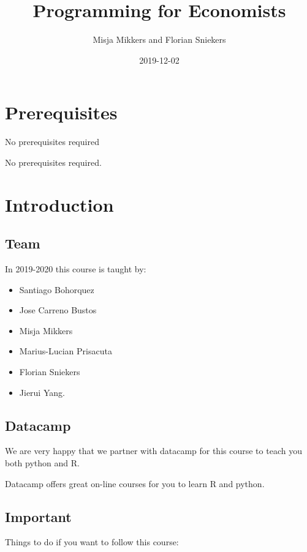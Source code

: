 \documentclass[]{book}
\title{Programming for Economists}
\author{Misja Mikkers and Florian Sniekers}
\date{2019-12-02}
\providecommand{\tightlist}{%
  \setlength{\itemsep}{0pt}\setlength{\parskip}{0pt}}
\begin{document}
\maketitle

{
\setcounter{tocdepth}{1}
\tableofcontents
}
\hypertarget{prerequisites}{%
\chapter{Prerequisites}\label{prerequisites}}

No prerequisites required

No prerequisites required.

\hypertarget{intro}{%
\chapter{Introduction}\label{intro}}

\hypertarget{team}{%
\section{Team}\label{team}}

In 2019-2020 this course is taught by:

\begin{itemize}
\tightlist
\item
  Santiago Bohorquez
\item
  Jose Carreno Bustos
\item
  Misja Mikkers
\item
  Marius-Lucian Prisacuta
\item
  Florian Sniekers
\item
  Jierui Yang.
\end{itemize}

\hypertarget{datacamp}{%
\section{Datacamp}\label{datacamp}}

We are very happy that we partner with datacamp for this course to teach you both python and R.

Datacamp offers great on-line courses for you to learn R and python.

\hypertarget{important}{%
\section{Important}\label{important}}

Things to do if you want to follow this course:
\end{document}
